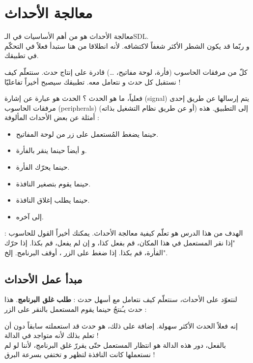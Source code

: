 \chapter{معالجة الأحداث}

معالجة الأحداث هو من أهم الأساسيات في الـ\textenglish{SDL}.\\
و ربّما قد يكون الشطر الأكثر شغفاً لاكتشافه. لأنه انطلاقا من هنا ستبدأ فعلاً في التحكّم في تطبيقك.

كلّ من مرفقات الحاسوب (فأرة، لوحة مفاتيح، \dots) قادرة على إنتاج حدث. سنتعلّم كيف نستقبل كل حدث و نتعامل معه. تطبيقك سيصبح أخيراً تفاعليّا !

فعلياً، ما هو الحدث ؟ الحدث هو عبارة عن إشارة
(\textenglish{signal})
يتم إرسالها عن طريق إحدى مرفقات الحاسوب 
(\textenglish{peripherals})
(أو عن طريق نظام التشغيل بذاته) إلى التطبيق. هذه أمثلة عن بعض الأحداث المألوفة :

\begin{itemize}
	\item حينما يضغط المُستعمل على زر من لوحة المفاتيح.
	\item و أيضاً حينما ينقر بالفأرة.
	\item حينما يحرّك الفأرة.
	\item حينما يقوم بتصغير النافذة.
	\item حينما يطلب إغلاق النافذة.
	\item إلى آخره.
\end{itemize}

الهدف من هذا الدرس هو تعلّم كيفية معالجة الأحداث. يمكنك أخيراً القول للحاسوب : "إذا نقر المستعمل في هذا المكان، قم بفعل كذا، و إن لم يفعل، قم بكذا. إذا حرّك الفأرة، قم بكذا. إذا ضغط على الزر
،
أوقف البرنامج. إلخ".

\section{مبدأ عمل الأحداث}

لنتعوّد على الأحداث، سنتعلّم كيف نتعامل مع أسهل حدث :
\textbf{طلب غلق البرنامج}.
هذا حدث يـُنتجُ حينما يقوم المستعمل بالنقر على الزر
 :


إنه فعلاً الحدث الأكثر سهولة. إضافة على ذلك، هو حدث قد استعملته سابقاً دون أن تعلم بذلك لأنه متواجد في الدالة 
 !\\
بالفعل، دور هذه الدالة هو انتظار المستعمل حتّى يقررّ غلق البرنامج، لأننا لو لم نستعملها كانت النافذة لتظهر و تختفي بسرعة البرق !

